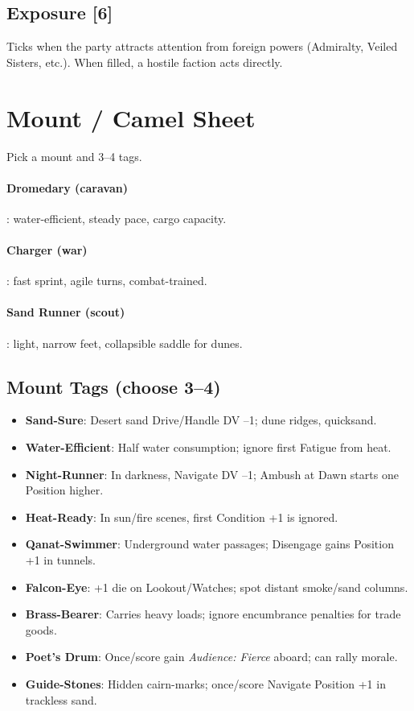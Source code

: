 \documentclass[12pt,oneside]{book}
\begin{document}
\subsection*{Exposure [6]}
Ticks when the party attracts attention from foreign powers (Admiralty, Veiled Sisters, etc.). When filled, a hostile faction acts directly.

\section*{Mount / Camel Sheet}
Pick a mount and 3--4 tags.

\paragraph{Dromedary (caravan)}: water-efficient, steady pace, cargo capacity.
\paragraph{Charger (war)}: fast sprint, agile turns, combat-trained.
\paragraph{Sand Runner (scout)}: light, narrow feet, collapsible saddle for dunes.

\subsection*{Mount Tags (choose 3--4)}
\begin{itemize}
  \item \textbf{Sand-Sure}: Desert sand Drive/Handle DV --1; dune ridges, quicksand.
  \item \textbf{Water-Efficient}: Half water consumption; ignore first Fatigue from heat.
  \item \textbf{Night-Runner}: In darkness, Navigate DV --1; Ambush at Dawn starts one Position higher.
  \item \textbf{Heat-Ready}: In sun/fire scenes, first Condition +1 is ignored.
  \item \textbf{Qanat-Swimmer}: Underground water passages; Disengage gains Position +1 in tunnels.
  \item \textbf{Falcon-Eye}: +1 die on Lookout/Watches; spot distant smoke/sand columns.
  \item \textbf{Brass-Bearer}: Carries heavy loads; ignore encumbrance penalties for trade goods.
  \item \textbf{Poet's Drum}: Once/score gain \textit{Audience: Fierce} aboard; can rally morale.
  \item \textbf{Guide-Stones}: Hidden cairn-marks; once/score Navigate Position +1 in trackless sand.
\end{itemize}
\end{document}
